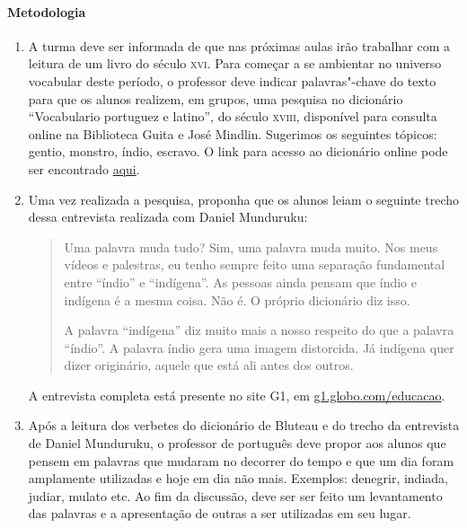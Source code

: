 \documentclass[12pt]{extarticle}
\begin{document}
\paragraph{Metodologia}

\begin{enumerate}

\item 
A turma deve ser informada de que nas próximas aulas irão trabalhar
com a leitura de um livro do século \textsc{xvi}. Para começar a se
ambientar no universo vocabular deste período, o professor deve indicar
palavras"-chave do texto para que os alunos realizem, em grupos, uma 
pesquisa no dicionário ``Vocabulario portuguez e latino'', do século 
\textsc{xviii}, disponível para consulta online na Biblioteca Guita e 
José Mindlin. Sugerimos os seguintes tópicos: gentio, monstro, índio, 
escravo.
O link para acesso ao dicionário online pode ser encontrado \href{http://dicionarios.bbm.usp.br/pt-br/dicionario/edicao/1}{aqui}.

\item
Uma vez realizada a pesquisa, proponha que os alunos leiam o seguinte 
trecho dessa entrevista realizada com Daniel Munduruku:

\begin{quote} Uma palavra muda tudo? Sim, uma palavra muda muito. Nos 
meus vídeos e palestras, eu tenho sempre feito uma separação fundamental 
entre ``índio'' e ``indígena''. As pessoas ainda pensam que índio e 
indígena é a mesma coisa. Não é. O próprio dicionário diz isso.

A palavra ``indígena'' diz muito mais a nosso respeito do que a palavra 
``índio''. A palavra índio gera uma imagem distorcida. Já indígena quer 
dizer originário, aquele que está ali antes dos outros.\end{quote}

A entrevista completa está presente no site G1, em \href{https://g1.globo.com/educacao/noticia/2019/04/19/dia-do-indio-e-data-folclorica-e-preconceituosa-diz-escritor-indigena-daniel-munduruku.ghtml}{g1.globo.com/educacao}. 

\item
Após a leitura dos verbetes do dicionário de Bluteau e do trecho da 
entrevista de Daniel Munduruku, o professor de português deve propor 
aos alunos que pensem em palavras que mudaram no decorrer do tempo e que
um dia foram amplamente utilizadas e hoje em dia não mais. Exemplos: 
denegrir, indiada, judiar, mulato etc. Ao fim da discussão, deve ser
ser feito um levantamento das palavras e a apresentação de outras a ser
utilizadas em seu lugar. 

\end{enumerate} 
\end{document}
